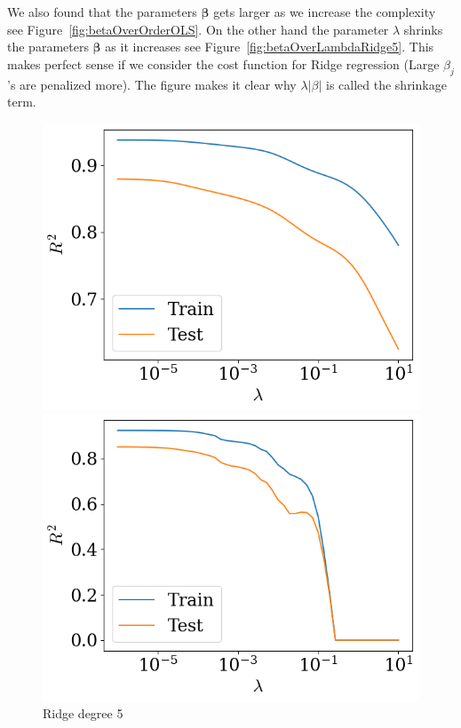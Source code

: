 \documentclass[twoside,11pt]{report}
\begin{document}
We also found that the parameters $\boldsymbol{\beta}$ gets larger as we increase the complexity see Figure~\ref{fig:betaOverOrderOLS}. On the other hand
the parameter $\lambda$ shrinks the parameters $\boldsymbol{\beta}$ as it increases see Figure~\ref{fig:betaOverLambdaRidge5}. This makes perfect sense if we
consider the cost function for Ridge regression (Large $\beta_j$'s are penalized more). The figure makes it clear why $\lambda |\beta|$ is called the shrinkage
term.

\begin{figure}[!h]
\begin{minipage}[!t]{.48\linewidth}
    \begin{center}
        \includegraphics[width=1.0\textwidth]{../runsAndAdditions/R2OverLambdaRidge5.png}
        \caption{Ridge degree 5}\label{fig:R2OverLambdaRidge5}
\end{center}
\end{minipage}
\hspace{4mm}
\begin{minipage}[!t]{.48\linewidth}
    \begin{center}
        \includegraphics[width=1.0\textwidth]{../runsAndAdditions/R2OverLambdaLasso5.png}

\end{center}
\end{minipage}
\end{figure}
\end{document}
